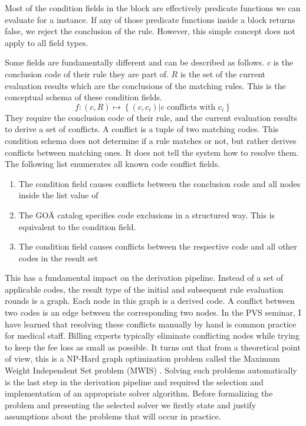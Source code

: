 Most of the condition fields in the  block are effectively predicate functions we can evaluate for a \REI instance.
If any of those predicate functions inside a  block returns false, we reject the conclusion of the rule.
However, this simple concept does not apply to all field types.

Some fields are fundamentally different and can be described as follows.
$c$ is the conclusion code of their rule they are part of.
$R$ is the set of the current evaluation results which are the conclusions of the matching rules.
This is the conceptual schema of these condition fields.
\[
    f: \left( c, R \right) \mapsto \left\{ \left( c, c_i \right) \lvert c \text{ conflicts with } c_i \right\}
\]
They require the conclusion code of their rule, and the current evaluation results to derive a set of conflicts.
A conflict is a tuple of two matching codes.
This condition schema does not determine if a rule matches or not, but rather derives conflicts between matching ones.
It does not tell the system how to resolve them.
The following list enumerates all known code conflict fields.
\begin{enumerate}
    \item The condition field  causes conflicts between the conclusion code and all nodes inside the list value of 
    \item The GOÄ catalog specifies code exclusions in a structured way.
    This is equivalent to the  condition field.
    \item The condition field  causes conflicts between the respective code and all other codes in the result set
\end{enumerate}

This has a fundamental impact on the derivation pipeline.
Instead of a set of applicable codes, the result type of the initial and subsequent rule evaluation rounds is a graph.
Each node in this graph is a derived code.
A conflict between two codes is an edge between the corresponding two nodes.
In the PVS seminar, I have learned that resolving these conflicts manually by hand is common practice for medical staff.
Billing experts typically eliminate conflicting nodes while trying to keep the fee loss as small as possible.
It turns out that from a theoretical point of view, this is a NP-Hard graph optimization problem called the Maximum Weight Independent Set problem
(MWIS) \cite{SAKAI2003313}.
Solving such problems automatically is the last step in the derivation pipeline
and required the selection and implementation of an appropriate solver algorithm.
Before formalizing the problem and presenting the selected solver we firstly state
and justify assumptions about the problems that will occur in practice.


